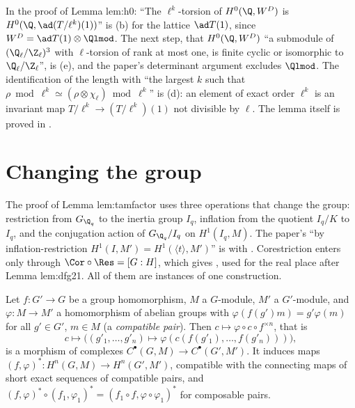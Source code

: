 \begin{paperlink}\label{pl:cohomology:h0}
\sloppy In the proof of Lemma lem:h0: ``The $\ell^k$-torsion of $H^0(\Q,W^D)$ is $H^0(\Q,\ad(T/\ell^k)(1))$'' is (b) for the lattice
$\ad T(1)$, since $W^D=\ad T(1)\otimes\Qlmod$. The next step, that $H^0(\Q,W^D)$ ``a submodule of $(\Q_\ell/\Z_\ell)^3$ with $\ell$-torsion of rank at most one, is finite cyclic or isomorphic to $\Q_\ell/\Z_\ell$'', is (e), and the
paper's determinant argument excludes $\Qlmod$. The identification of the length with ``the largest $k$ such that $\rho\bmod\ell^k\simeq(\rho\otimes\chi_\ell)\bmod\ell^k$''
is (d): an element of exact order $\ell^k$ is an invariant map $T/\ell^k\to(T/\ell^k)(1)$ not divisible by $\ell$. The lemma itself is proved in .
\end{paperlink}

\section{Changing the group}\label{sec:cohomology:change}

The proof of Lemma lem:tamfactor uses three operations that change the group: restriction from $G_{\Q_q}$ to the inertia group $I_q$, inflation from
the quotient $I_q/K$ to $I_q$, and the conjugation action of $G_{\Q_q}/I_q$ on $H^1(I_q,M)$. The paper's ``by inflation-restriction
$H^1(I,M')=H^1(\langle t\rangle,M')$'' is  with . Corestriction enters only through
$\Cor\circ\Res=[G:H]$, which gives , used for the real place after Lemma lem:dfg21. All of them are instances of
one construction.

\begin{proposition}\label{prop:cohomology:compatible}
Let $f\colon G'\to G$ be a group homomorphism, $M$ a $G$-module, $M'$ a $G'$-module, and $\varphi\colon M\to M'$ a homomorphism of abelian groups with
$\varphi(f(g')m)=g'\varphi(m)$ for all $g'\in G'$, $m\in M$ (a \emph{compatible pair}). Then $c\mapsto\varphi\circ c\circ f^{\times n}$, that is
\[
c\longmapsto\bigl((g'_1,\dots,g'_n)\mapsto\varphi(c(f(g'_1),\dots,f(g'_n)))\bigr),
\]
is a morphism of complexes $C^\bullet(G,M)\to C^\bullet(G',M')$. It induces maps $(f,\varphi)^*\colon H^n(G,M)\to H^n(G',M')$, compatible with the connecting
maps of short exact sequences of compatible pairs, and $(f,\varphi)^*\circ(f_1,\varphi_1)^*=(f_1\circ f,\varphi\circ\varphi_1)^*$ for composable pairs.
\end{proposition}

